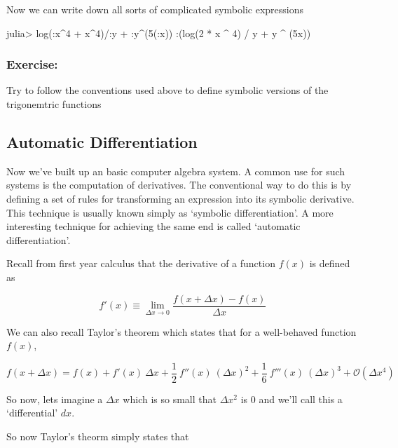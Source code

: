\documentclass[11pt]{article}
\newenvironment{Shaded}{}{}
\newcommand{\FloatTok}[1]{\textcolor[rgb]{0.25,0.63,0.44}{{#1}}}
\newcommand{\NormalTok}[1]{{#1}}
\begin{document}
    Now we can write down all sorts of complicated symbolic expressions

\begin{Shaded}
\begin{Highlighting}[]
\NormalTok{julia> log(:x^}\FloatTok{4}\NormalTok{ + x^}\FloatTok{4}\NormalTok{)/:y + :y^(}\FloatTok{5}\NormalTok{(:x))}
\NormalTok{:(log(}\FloatTok{2}\NormalTok{ * x ^ }\FloatTok{4}\NormalTok{) / y + y ^ (}\FloatTok{5}\NormalTok{x))}
\end{Highlighting}
\end{Shaded}

\hypertarget{exercise}{%
\subsubsection{Exercise:}\label{exercise}}

Try to follow the conventions used above to define symbolic versions of
the trigonemtric functions

\hypertarget{automatic-differentiation}{%
\subsection{Automatic Differentiation}\label{automatic-differentiation}}

Now we've built up an basic computer algebra system. A common use for
such systems is the computation of derivatives. The conventional way to
do this is by defining a set of rules for transforming an expression
into its symbolic derivative. This technique is usually known simply as
`symbolic differentiation'. A more interesting technique for achieving
the same end is called `automatic differentiation'.

Recall from first year calculus that the derivative of a function
\(f(x)\) is defined as

\[
f'(x) \equiv \lim_{\Delta x \rightarrow 0} \frac{f(x+\Delta x) - f(x)}{\Delta x}
\]

We can also recall Taylor's theorem which states that for a well-behaved
function \(f(x)\),

\[
f(x + \Delta x) = f(x) + f'(x) ~ \Delta x + \frac{1}{2}~ f''(x) ~ (\Delta x)^2 + \frac{1}{6}~ f'''(x) ~ (\Delta x)^3 + \mathcal{O}(\Delta x ^4)
\]

So now, lets imagine a \(\Delta x\) which is so small that
\(\Delta x^2\) is \(0\) and we'll call this a `differential' \(dx\).

So now Taylor's theorm simply states that
\end{document}

